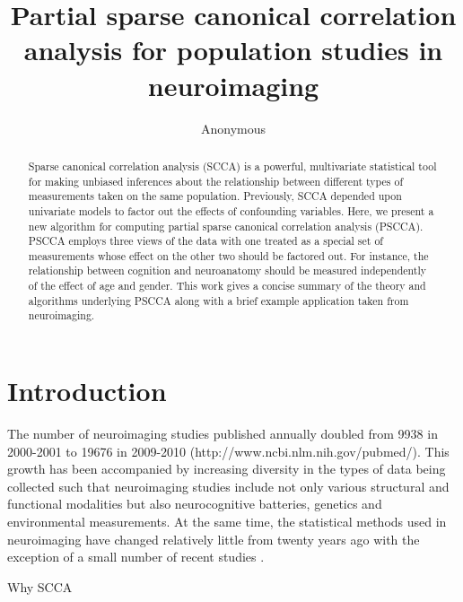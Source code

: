 \documentclass{llncs}
\begin{document}
\vspace{-0.1in}
\title{Partial sparse canonical correlation analysis for population
  studies in neuroimaging}
\author{Anonymous}
\maketitle              
\begin{abstract}
Sparse canonical correlation analysis (SCCA) is a powerful,
multivariate statistical tool for making unbiased inferences about the
relationship between different types of measurements taken on the same
population.  Previously, SCCA depended upon univariate models to
factor out the effects of confounding variables.  Here, we present a
new algorithm for computing partial sparse canonical correlation
analysis (PSCCA).  PSCCA employs three views of the data with one
treated as a special set of measurements whose effect on the other two
should be factored out.  For instance, the relationship between
cognition and neuroanatomy should be measured independently of the
effect of age and gender.  This work gives a concise summary of the
theory and algorithms underlying PSCCA along with a brief example
application taken from neuroimaging.
\end{abstract}
\section{Introduction}
The number of neuroimaging studies published annually doubled from
9938 in 2000-2001 to 19676 in 2009-2010
(http://www.ncbi.nlm.nih.gov/pubmed/).  This growth has been
accompanied by increasing diversity in the types of data being
collected such that neuroimaging studies include not only various
structural and functional modalities but also neurocognitive
batteries, genetics and environmental measurements.  At the same
time, the statistical methods used in neuroimaging have changed
relatively little from twenty years ago with the exception of a small
number of recent studies \cite{Tosun2010a}.

Why SCCA
\end{document}
